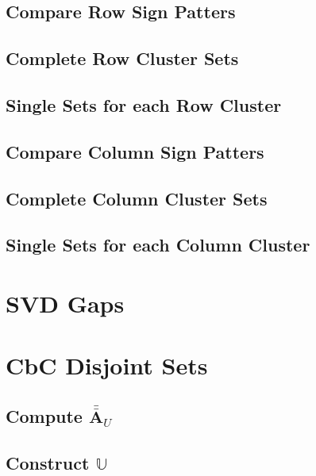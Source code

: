 \documentclass{book}[12pt]
\numberwithin{equation}{section}
\newcommand{\mat}[1]{\bar{\bar{\mathbf{#1}}}}
\begin{document}
\section{Compare Row Sign Patters}


\section{Complete Row Cluster Sets}


\section{Single Sets for each Row Cluster}


\section{Compare Column Sign Patters}


\section{Complete Column Cluster Sets}


\section{Single Sets for each Column Cluster}



\chapter{SVD Gaps}




\chapter{CbC Disjoint Sets}


\section{Compute $\mat{A}_U$}


\section{Construct $\mathbb{U}$}

\end{document}
